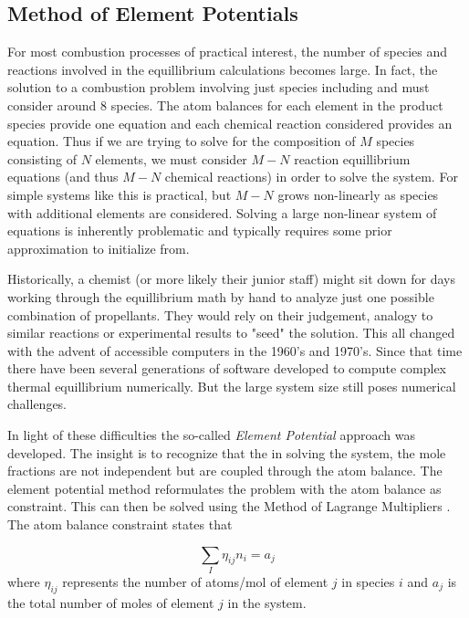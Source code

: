 \documentclass[twocolumn]{memoir} %
\begin{document}
\subsection{Method of Element Potentials}
For most combustion processes of practical interest, the number of species and reactions involved in
the equillibrium calculations becomes large.  In fact, the solution to a combustion problem involving
just species including   and  must consider around 8 species.  The atom balances 
for each element in the product species provide one equation and each chemical reaction considered 
provides an equation. Thus if we are trying to solve for the composition of $M$ species consisting of
$N$ elements, we must consider $M-N$ reaction equillibrium equations (and thus $M-N$ chemical reactions)
in order to solve the system.  For simple systems like  this is practical, but $M-N$ grows
non-linearly as species with additional elements are considered.  Solving a large non-linear system
of equations is inherently problematic and typically requires some prior approximation to initialize
from.  

Historically, a chemist (or more likely their junior
staff) might sit down for days working through the equillibrium math by hand to analyze just one possible
combination of propellants.  They would rely on their judgement, analogy to similar reactions or experimental
results to "seed" the solution.  This all changed with the advent of accessible computers in the 1960's
and 1970's.  Since that time there have been several generations of software developed to compute
complex thermal equillibrium numerically.  But the large system size still poses numerical challenges.

In light of these difficulties the so-called \emph{Element Potential} approach was developed.  The 
insight is to recognize that the in solving the system, the mole fractions are not independent but
are coupled through the atom balance.  The element potential method reformulates the problem with the
atom balance as constraint.  This can then be solved using the Method of Lagrange Multipliers \cite{gordon0}.  
The atom balance constraint states that

\begin{equation}
    \sum_I \eta_{ij}n_i = a_j
\end{equation}
%
where $\eta_{ij}$ represents the number of atoms/mol of element $j$ in species $i$ and $a_j$ is the 
total number of moles of element $j$ in the system.
\end{document}
